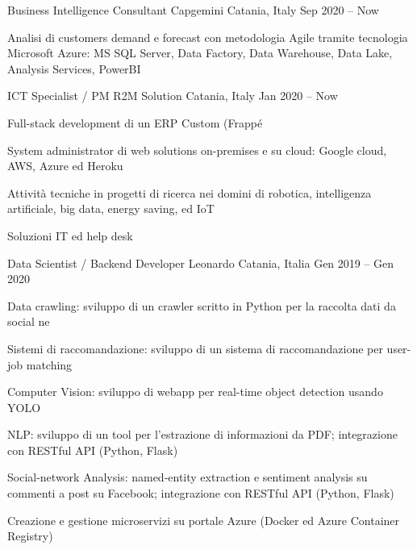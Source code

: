 
  \begin{cventries}
    \cventry
    {Business Intelligence Consultant}
    {Capgemini}    
    {Catania, Italy}
    {Sep 2020 -- Now}
    {
      \begin{cvitems}
        \item {
          Analisi di customers demand e forecast con metodologia Agile tramite tecnologia Microsoft Azure: 
          MS SQL Server, Data Factory, Data Warehouse, Data Lake, Analysis Services, PowerBI
        }
      \end{cvitems}
    }

    \cventry
    {ICT Specialist / PM}
    {R2M Solution}    
    {Catania, Italy}
    {Jan 2020 -- Now}
    {
      \begin{cvitems}
        \item {Full-stack development di un ERP Custom (Frappé}
        \item {System administrator di web solutions on-premises e su cloud: Google cloud, AWS, Azure ed Heroku}
        \item {Attività tecniche in progetti di ricerca nei domini di robotica, intelligenza artificiale, big data, energy saving, ed IoT}
        \item {Soluzioni IT ed help desk}
      \end{cvitems}
    }

    \cventry
    {Data Scientist / Backend Developer}
    {Leonardo}    
    {Catania, Italia}
    {Gen 2019 -- Gen 2020}
    {
      \begin{cvitems}
        \item {Data crawling: sviluppo di un crawler scritto in Python per la raccolta dati da social ne}
        \item {Sistemi di raccomandazione: sviluppo di un sistema di raccomandazione per user-job matching}
        \item {Computer Vision: sviluppo di webapp per real-time object detection usando YOLO}
        \item {NLP: sviluppo di un tool per l'estrazione di informazioni da PDF; integrazione con RESTful API (Python, Flask)}
        \item {Social-network Analysis: named-entity extraction e sentiment analysis su commenti a post su Facebook; integrazione con RESTful API (Python, Flask)}
        \item {Creazione e gestione microservizi su portale Azure (Docker ed Azure Container Registry)}
      \end{cvitems}
    }


\end{cventries}
